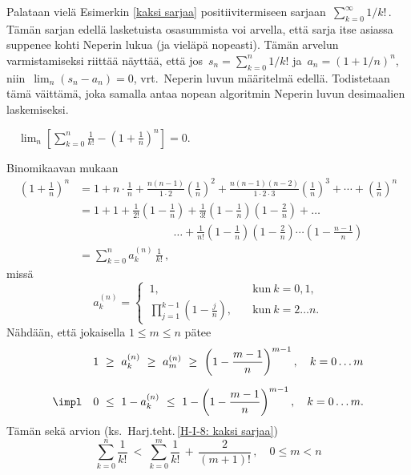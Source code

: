 Palataan vielä Esimerkin \ref{kaksi sarjaa} positiivitermiseen sarjaan 
$\,\sum_{k=0}^\infty 1/k!\,$. Tämän sarjan edellä lasketuista osasummista
voi arvella, että sarja itse asiassa suppenee kohti Neperin lukua (ja vieläpä nopeasti).
Tämän arvelun varmistamiseksi riittää näyttää, että jos $\,s_n=\sum_{k=0}^n 1/k!$ ja 
$\,a_n=(1+1/n)^n$, niin $\,\lim_n(s_n-a_n)=0$, vrt.\ Neperin luvun määritelmä edellä.
Todistetaan tämä väittämä, joka samalla antaa nopean algoritmin Neperin luvun desimaalien 
laskemiseksi.
\begin{Prop} \label{e:n sarja}
$\quad \displaystyle{
\lim_n \left[\sum_{k=0}^n \frac{1}{k!}-\left(1+\frac{1}{n}\right)^n\right] = 0.}$
\end{Prop}
\tod Binomikaavan mukaan
\begin{align*}
\left(1+\frac{1}{n}\right)^n 
  &= 1+n\cdot\frac{1}{n}+\frac{n(n-1)}{1\cdot 2}\left(\frac{1}{n}\right)^2
                        +\frac{n(n-1)(n-2)}{1\cdot 2\cdot 3}\left(\frac{1}{n}\right)^3 + \cdots
                        + \left(\frac{1}{n}\right)^n \\
  &=1+1+\frac{1}{2!}\left(1-\frac{1}{n}\right)
                +\frac{1}{3!}\left(1-\frac{1}{n}\right)\left(1-\frac{2}{n}\right) + \ldots \\
  &\qquad\qquad\qquad\quad\quad\ \ \ldots  
       + \frac{1}{n!}\left(1-\frac{1}{n}\right)
                     \left(1-\frac{2}{n}\right)\cdots\left(1-\frac{n-1}{n}\right) \\
  &=\sum_{k=0}^n a_k^{(n)}\,\frac{1}{k!}\,,
\end{align*}
missä
\[
a_k^{(n)} = \begin{cases} 
            \,1,                                           \quad &\text{kun}\ k=0,1, \\
            \,\prod_{j=1}^{k-1}\left(1-\frac{j}{n}\right), \quad &\text{kun}\ k=2 \ldots n.
            \end{cases} \]
Nähdään, että jokaisella $1 \le m \le n$ pätee 
\begin{align*}
1\            &\ge\ a_k^{(n)}\ \ge\ a_m^{(n)}\ 
                           \ge\ \left(1-\frac{m-1}{n}\right)^{m-1}, \quad k = 0 \ldots m \\[2mm]
\impl\quad 0\ &\le\ 1-a_k^{(n)}\ \le\ 1-\left(1-\frac{m-1}{n}\right)^{m-1}, \quad k= 0 \ldots m.
\end{align*}
Tämän sekä arvion (ks.\ Harj.teht.\,\ref{H-I-8: kaksi sarjaa})
\[
\sum_{k=0}^n \frac{1}{k!}\ <\ \sum_{k=0}^m \frac{1}{k!} \,+\, \frac{2}{(m+1)!}\,, \quad 
                           0 \le m < n
\]
